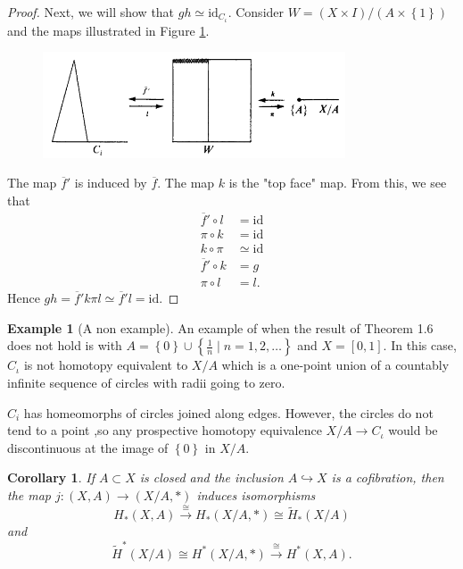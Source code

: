 \documentclass[reqno]{amsart}
\newtheorem{corollary}[theorem]{Corollary}
\theoremstyle{definition}
\newtheorem{example}[theorem]{Example}
\theoremstyle{remark}
\newcommand{\id}{{\mathrm{id}}}
\begin{document}
\begin{proof}
    Next, we will show that $gh \simeq \id_{C_{\iota}}$.
    Consider $W = \left( X \times I \right) / 
    \left( A \times \left\{ 1 \right\}  \right) $ 
    and the maps illustrated in Figure \ref{fig:DWIJJXNXJNXJUI-png}.

    \begin{figure}[htpb]
        \centering
        \includegraphics[width=0.8\textwidth]{Figures/DWIJJXNXJNXJUI.png}
        \caption{}
        \label{fig:DWIJJXNXJNXJUI-png}
    \end{figure}
    The map $\overline{f}'$ is induced by
    $\overline{f}$. The map
    $k$ is the "top face" map.
    From this, we see that
    \begin{align*}
        \overline{f}' \circ l 
        &= \id \\
        \pi \circ k 
        &= \id \\
        k \circ \pi 
        &\simeq \id \\
        \overline{f}' \circ k
        &= g \\
        \pi \circ l 
        &= l.
    \end{align*}
   Hence $g h = \overline{f}' k \pi l 
   \simeq \overline{f}' l = \id$. 
\end{proof}


\begin{example}[A non example]
    An example of when the result
    of Theorem 1.6 does not hold is with
    $A = \left\{ 0 \right\} \cup 
    \left\{ \frac{1}{n} \mid n = 1, 2, \ldots \right\} $ 
    and $X = \left[ 0,1 \right] $.
    In this case, $C_{\iota}$ is not homotopy equivalent
    to $X / A$ which is a one-point union of a countably infinite
    sequence of circles with radii going to zero.

    $C_i$ has homeomorphs of circles joined along edges. However,
    the circles do not tend to a point ,so any prospective homotopy
    equivalence $X / A \to C_{\iota}$ would be discontinuous at
    the image of $\left\{ 0 \right\} $ in $X / A$.
\end{example}

\begin{corollary}\label{Cor:Cofibration-Homology}
    If $A \subset X$ is closed and the inclusion
    $A \hookrightarrow X$ is a cofibration, then the map
    $j \colon \left( X, A \right) \to 
    \left( X / A, * \right) $ induces isomorphisms
    \[
    H_* (X,A) \stackrel{\cong}{\to} 
    H_* \left( X / A, * \right) 
    \cong \tilde{H}_* \left( X / A \right) 
    \] 
    and
    \[
    \tilde{H}^{*}(X /A) \cong
    H^{*} (X / A, *) 
    \stackrel{\cong}{\to} H^{*} (X , A).
    \] 
\end{corollary}
\end{document}
